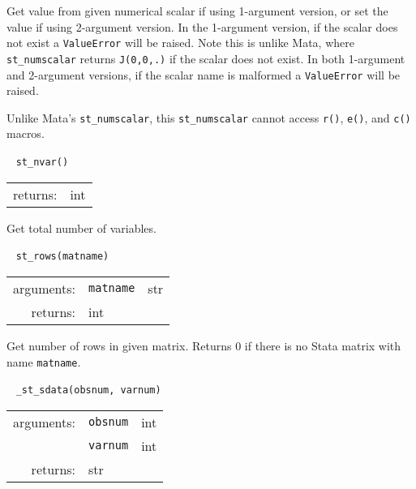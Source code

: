 \documentclass{article}
\begin{document}
			\vspace{1.5mm}
			\noindent Get value from given numerical scalar if using 1-argument version, or set the value if using 2-argument version. In the 1-argument version, if the scalar does not exist a \lstinline{ValueError} will be raised. Note this is unlike Mata, where \lstinline{st_numscalar} returns \lstinline{J(0,0,.)} if the scalar does not exist. In both 1-argument and 2-argument versions, if the scalar name is malformed a \lstinline{ValueError} will be raised. 
			
			Unlike Mata's \lstinline{st_numscalar}, this \lstinline{st_numscalar} cannot access \lstinline{r()}, \lstinline{e()}, and \lstinline{c()} macros. \newline
			
			
			\ \newline
			\noindent \lstinline$st_nvar()$
								
			\vspace{1.5mm}
			\noindent 
			\indent \begin{tabular}{rl}
					returns: & int
				\end{tabular}
								
			\vspace{1.5mm}
			\noindent Get total number of variables. \newline
			
			
			\ \newline
			\noindent \lstinline$st_rows(matname)$
								
			\vspace{1.5mm}
			\noindent 
			\indent \begin{tabular}{rrl}
					arguments: & \texttt{matname} & str \\
					returns: & \multicolumn{2}{l}{int}
				\end{tabular}
								
			\vspace{1.5mm}
			\noindent Get number of rows in given matrix. Returns 0 if there is no Stata matrix with name \lstinline$matname$. \newline
			
			
			\ \newline
			\noindent \lstinline$_st_sdata(obsnum, varnum)$
								
			\vspace{1.5mm}
			\noindent 
			\indent \begin{tabular}{rrl}
					arguments: & \texttt{obsnum} & int \\
						& \texttt{varnum} & int \\
					returns: & \multicolumn{2}{l}{str}
				\end{tabular}
								
\end{document}
